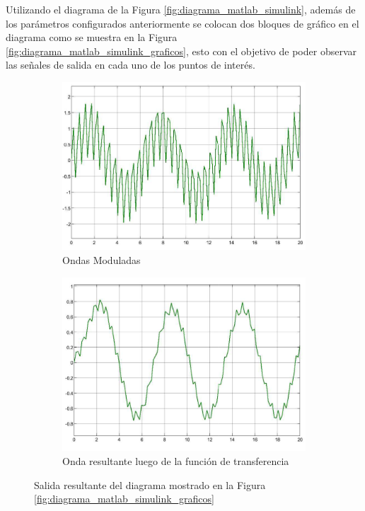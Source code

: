 Utilizando el diagrama de la Figura \ref{fig:diagrama_matlab_simulink}, además de los parámetros configurados anteriormente se colocan dos bloques de gráfico en el diagrama como se muestra en la Figura \ref{fig:diagrama_matlab_simulink_graficos}, esto con el objetivo de poder observar las señales de salida en cada uno de los puntos de interés. 


\begin{figure}[htbp]
    \centering
    \begin{subfigure}[b]{0.45\textwidth}
        \centering
        \includegraphics[width=\textwidth]{fig/especifico_2/onda_modulada.pdf}
        \caption{Ondas Moduladas}
        \label{fig:onda_modulada}
    \end{subfigure}
    \hfill
    \begin{subfigure}[b]{0.45\textwidth}
        \centering
        \includegraphics[width=\textwidth]{fig/especifico_2/onda_filtrada.pdf}
        \caption{Onda resultante luego de la función de transferencia}
        \label{fig:onda_filtrada}
    \end{subfigure}
    \caption{Salida resultante del diagrama mostrado en la Figura \ref{fig:diagrama_matlab_simulink_graficos}}
    \label{fig:salida_resultante_diagrama_graficos}
\end{figure}


